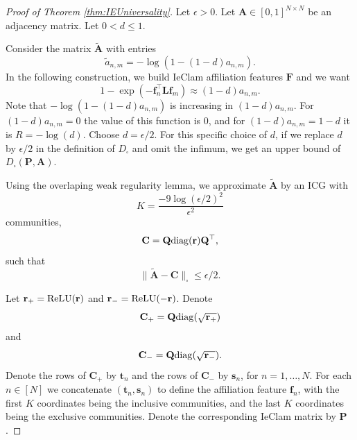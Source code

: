 \documentclass{article}
\theoremstyle{plain}
\theoremstyle{definition}
\theoremstyle{remark}
\begin{document}
\begin{proof}[Proof of Theorem \ref{thm:IEUniversality}]
 Let $\epsilon>0$. Let $\mathbf{A}\in[0,1]^{N\times N}$ be an adjacency matrix. Let $0<d\leq 1$.

Consider the matrix  $\tilde{\mathbf{A}}$ with entries
\[\tilde{a}_{n,m}=-\log(1-(1-d)a_{n,m}).\]
In the following construction, we build IeClam affiliation features $\mathbf{F}$ and we want
\[1-\exp(-\mathbf{f}_n^{\top}\mathbf{L}\mathbf{f}_m)\approx (1-d)a_{n,m}.\]
Note that $-\log(1-(1-d)a_{n,m})$ is increasing in $(1-d)a_{n,m}$. For $(1-d)a_{n,m}=0$ the value of this function is 0, and for $(1-d)a_{n,m}=1-d$ it is $R=-\log(d)$. Choose $d=\epsilon/2$. For this specific choice of $d$, if we replace $d$ by $\epsilon/2$ in the definition of $D_{\square}$ and omit the infimum, we get an upper bound of $D_{\square}(\mathbf{P},\mathbf{A})$.
 



Using the overlaping weak regularity lemma, we approximate $\tilde{\mathbf{A}}$ by an ICG with 
\[K=\frac{-9\log(\epsilon/2)^2}{\epsilon^2}\]
communities,
\[\mathbf{C}= \mathbf{Q}{\rm diag}(\mathbf{r})\mathbf{Q}^{\top },\]
such that
\[\|\tilde{\mathbf{A}}-\mathbf{C}\|_{\square} \leq \epsilon/2.\]

Let $\mathbf{r}_+={\rm ReLU}(\mathbf{r})$ and $\mathbf{r}_-={\rm ReLU}(-\mathbf{r})$. Denote
\[\mathbf{C}_+=\mathbf{Q}{\rm diag}(\sqrt{\mathbf{r}_+})\]
and
\[\mathbf{C}_-=\mathbf{Q}{\rm diag}(\sqrt{\mathbf{r}_-}).\]
Denote the rows of $\mathbf{C}_+$ by $\mathbf{t}_n$ and the rows of $\mathbf{C}_-$  by $\mathbf{s}_n$, for $n=1,\ldots,N$. For each $n\in[N]$ we concatenate $(\mathbf{t}_n,\mathbf{s}_n)$ to define the affiliation feature $\mathbf{f}_n$, with the first $K$ coordinates being the inclusive communities, and the last $K$ coordinates being the exclusive communities. Denote the corresponding IeClam matrix by $\mathbf{P}$.


\end{proof}
\end{document}
